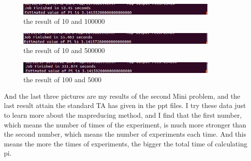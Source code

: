 \documentclass{article}
\begin{document}
\begin{figure}[htbp]
\centering
\includegraphics[width=10cm]{006.png}
\caption{the result of 10 and 100000}
\end{figure}
\begin{figure}[htbp]
\centering
\includegraphics[width=10cm]{007.png}
\caption{the result of 10 and 500000}
\end{figure}
\begin{figure}[htbp]
\centering
\includegraphics[width=10cm]{008.png}
\caption{the result of 100 and 5000}
\end{figure}
And the last three pictures are my results of the second Mini problem, and the last result attain the standard TA has given in the ppt files. I try these data just to learn more about the mapreducing method, and I find that the first number, which means the number of times of the experiment, is much more stronger than the second number, which means the number of experiments each time. And this means the more the times of experiments, the bigger the total time of calculating pi.
\end{document}
